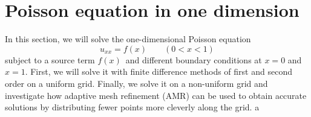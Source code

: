 \section{Poisson equation in one dimension}
\label{task_1}

In this section, we will solve the one-dimensional Poisson equation
\begin{equation*}
u_{xx} = f(x) \qquad (0 < x < 1)
\end{equation*}
subject to a source term $f(x)$ and different boundary conditions at $x = 0$ and $x = 1$.
First, we will solve it with finite difference methods of first and second order on a uniform grid.
Finally, we solve it on a non-uniform grid and investigate how adaptive mesh refinement (AMR) can be used to obtain accurate solutions by distributing fewer points more cleverly along the grid.
a

